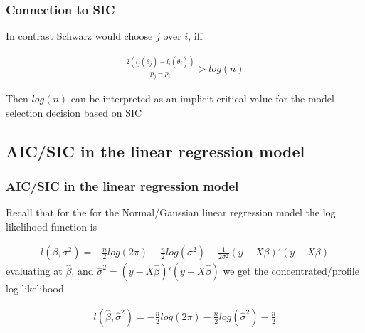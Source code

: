 \documentclass[
  shownotes,
  xcolor={svgnames},
  hyperref={colorlinks,citecolor=DarkBlue,linkcolor=DarkRed,urlcolor=DarkBlue}
  ]{beamer}
\begin{document}
\begin{frame}[fragile]
\frametitle{Connection to SIC}

  In contrast Schwarz would choose $j$ over $i$, iff 

 \begin{align}
 \frac{2(l_j(\hat \theta_j)-l_i(\hat \theta_i))}{p_j-p_i} > log(n)
 \end{align}

Then $log(n)$ can be interpreted as an implicit critical value for the model selection decision based on SIC

 \end{frame}

\subsection{AIC/SIC in the linear regression model}
\begin{frame}[fragile]
\frametitle{AIC/SIC in the linear regression model}
Recall that for the for the Normal/Gaussian linear regression model the log likelihood function is

\begin{align}
l(\beta,\sigma^2) = -\frac{n}{2}log(2\pi)-\frac{n}{2}log(\sigma^2) -\frac{1}{2\sigma^2} (y-X\beta)'(y-X\beta)
\end{align}
evaluating at $\hat \beta$, and $\hat{\sigma}^2=(y-X\hat\beta)'(y-X\hat\beta)$ we get the concentrated/profile log-likelihood

\begin{align}
l(\hat \beta,\hat \sigma^2) = -\frac{n}{2}log(2\pi)-\frac{n}{2}log(\hat \sigma^2) -\frac{n}{2}
\end{align}


 \end{frame}
\end{document}
